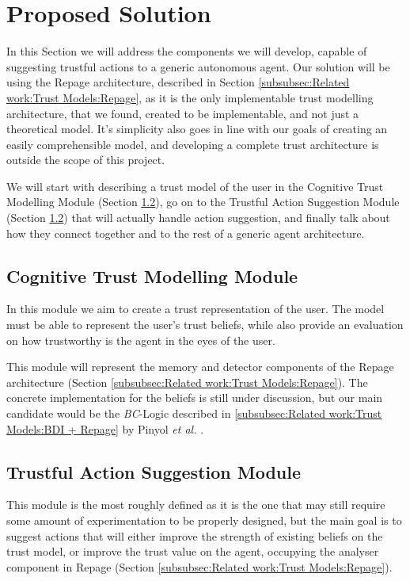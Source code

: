 \section{Proposed Solution}
\label{sec:Solution}
In this Section we will address the components we will develop, capable of suggesting trustful actions to a generic autonomous agent. Our solution will be using the Repage architecture, described in Section \ref{subsubsec:Related work:Trust Models:Repage}, as it is the only implementable trust modelling architecture, that we found, created to be implementable, and not just a theoretical model. It's simplicity also goes in line with our goals of creating an easily comprehensible model, and developing a complete trust architecture is outside the scope of this project.

We will start with describing a trust model of the user in the Cognitive Trust Modelling Module (Section \ref{subsec:Solution:Trust Decision Making Module}), go on to the Trustful Action Suggestion Module (Section \ref{subsec:Solution:Trust Decision Making Module}) that will actually handle action suggestion, and finally talk about how they connect together and to the rest of a generic agent architecture.


\subsection{Cognitive Trust Modelling Module}
\label{subsec:Solution:Trust Assessment Module}
In this module we aim to create a trust representation of the user. The model must be able to represent the user's trust beliefs, while also provide an evaluation on how trustworthy is the agent in the eyes of the user. 

This module will represent the memory and detector components of the Repage architecture (Section \ref{subsubsec:Related work:Trust Models:Repage}). The concrete implementation for the beliefs is still under discussion, but our main candidate would be the \textit{BC}-Logic described in \ref{subsubsec:Related work:Trust Models:BDI + Repage} by Pinyol \textit{et al.} \cite{Pinyol2009}.

\subsection{Trustful Action Suggestion Module}
\label{subsec:Solution:Trust Decision Making Module}
This module is the most roughly defined as it is the one that may still require some amount of experimentation to be properly designed, but the main goal is to suggest actions that will either improve the strength of existing beliefs on the trust model, or improve the trust value on the agent, occupying the analyser component in Repage (Section \ref{subsubsec:Related work:Trust Models:Repage}).

